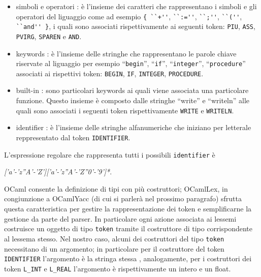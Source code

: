 \documentclass[a4paper,10pt]{article}
\begin{document}
\begin{itemize}
 \item simboli e operatori : \`e l'insieme dei caratteri che rappresentano i 
simboli e gli operatori del liguaggio come ad esempio \verb|{ ``+''|,
\verb|``:=''|, \verb|``;''|, \verb|``(''|, \verb|``and'' }|, i quali sono
associati rispettivamente ai seguenti token: \verb|PIU|, \verb|ASS|,
\verb|PVIRG|, \verb|SPAREN| e \verb|AND|.
\end{itemize}
\begin{itemize}
 \item keywords : \`e l'insieme delle stringhe che rappresentano le parole 
chiave riservate al liguaggio
per esempio ``\texttt{begin}'', ``\texttt{if}'', ``\texttt{integer}'',
``\texttt{procedure}'' associati 
ai rispettivi token: \verb|BEGIN|, \verb|IF|, \verb|INTEGER|, \verb|PROCEDURE|.
\end{itemize}
\begin{itemize}
 \item built-in : sono particolari keywords ai quali viene associata una 
particolare funzione.
Questo insieme \`e composto dalle stringhe ``write'' e ``writeln'' alle quali 
sono associati i seguenti token rispettivamente \verb|WRITE| e \verb|WRITELN|.
\end{itemize}
\begin{itemize}
 \item identifier : \`e l'insieme delle stringhe alfanumeriche che iniziano per 
letterale reppresentato dal token \verb|IDENTIFIER|.
\end{itemize} 
L'espressione regolare che rappresenta tutti i possibili \verb|identifier| \`e
\begin{center}
 \textit{['a'-'z''A'-'Z']['a'-'z''A'-'Z''0'-'9']*}.
\end{center}
OCaml consente la definizione di tipi con pi\`u costruttori;
OCamlLex, in congiunzione a OCamlYacc (di cui si parler\`a nel prossimo 
paragrafo) sfrutta questa caratteristica per gestire la rappresentazione dei
token e semplificarne la gestione da parte del parser.
In particolare ogni azione associata ai lessemi costruisce un oggetto di tipo 
\verb|token| tramite il costruttore di tipo corrispondente al lessema stesso.
Nel nostro caso, alcuni dei costruttori del tipo \verb|token| necessitano di 
un argomento; in particolare per il costruttore del token \verb|IDENTIFIER|
l'argomento \`e la stringa stessa , analogamente, per i costruttori dei token
\verb|L_INT| e \verb|L_REAL| l'argomento \`e rispettivamente un intero e un
float.
\end{document}
